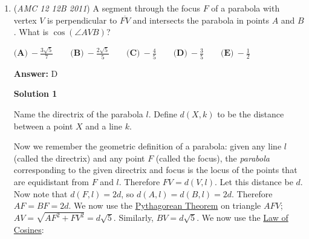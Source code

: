 \begin{enumerate}
 \begin{align*} \text{if} \hspace{1cm} a &= 5\\ a + b &= 6\\ 4z &= 44 - 9 - 5 - 6\\ z &= 6\\ w &= 15\\ \end{align*}


 
The sum of the two w's is $15+16=31$ $\boxed{B}$




\textbf{Solution 2}

Let the four numbers be $z$, $z+a$, $z+b$, and $z+c$. We know that $c$ must be $9$ because that's the greatest difference. So we have $z$, $z+a$, $z+b$, and $z+9$. The 6 possible differences are $a$, $b$, $9$, $b-a$, $9-a$, and $9-b$. We are given that the differences are 1, 3, 4, 5, 6, 9. $a$ and $9-a$ and $b$ and $9-b$ add to 9 which means they have to be 4, 5 and 3,6 or vice versa. Which leaves $1$. That means $b-a$ has to equal $1$. So a and b have to be 3,4, 4,5, or 5,6. For 3,4, we have $z$, $z+3$, $z+4$, and $z+9$. $4z+16=44$. $4z=28$. $z=7$. $w=7+9=16$. Now for 4,5, notice that it doesn't work. The differences are 4, 5, 9, 1, 4, 5. We are missing 6 and 3. For 5,6, it's $z$, $z+5$, $z+6$, and $z+9$. Check that the differences work; they do. We have $4z+20=44$. $4z=24$. $z=6$. $w=6+9=15$. Therefore our answer is $15+16=\boxed{31}$.~MC413551

 


	\item (\textit{AMC 12 12B 2011}) A segment through the focus $F$ of a parabola with vertex $V$ is perpendicular to $\overline{FV}$ and intersects the parabola in points $A$ and $B$. What is $\cos\left(\angle AVB\right)$?


 $\textbf{(A)}\ -\frac{3\sqrt{5}}{7} \qquad \textbf{(B)}\ -\frac{2\sqrt{5}}{5} \qquad \textbf{(C)}\ -\frac{4}{5} \qquad \textbf{(D)}\ -\frac{3}{5} \qquad \textbf{(E)}\ -\frac{1}{2}$

 \textbf{Answer: }D



\textbf{Solution  1}

Name the directrix of the parabola $l$. Define $d(X,k)$ to be the distance between a point $X$ and a line $k$.

 Now we remember the geometric definition of a parabola: given any line $l$ (called the directrix) and any point $F$ (called the focus), the \textit{parabola} corresponding to the given directrix and focus is the locus of the points that are equidistant from $F$ and $l$. Therefore $FV=d(V,l)$. Let this distance be $d$. Now note that $d(F,l)=2d$, so $d(A,l)=d(B,l)=2d$. Therefore $AF=BF=2d$. We now use the \href{https://artofproblemsolving.com/wiki/index.php?title=Pythagorean\_Theorem}{Pythagorean Theorem} on triangle $AFV$; $AV=\sqrt{AF^2+FV^2}=d\sqrt{5}$. Similarly, $BV=d\sqrt{5}$. We now use the \href{https://artofproblemsolving.com/wiki/index.php?title=Law\_of\_Cosines}{Law of Cosines}:


\end{enumerate}
